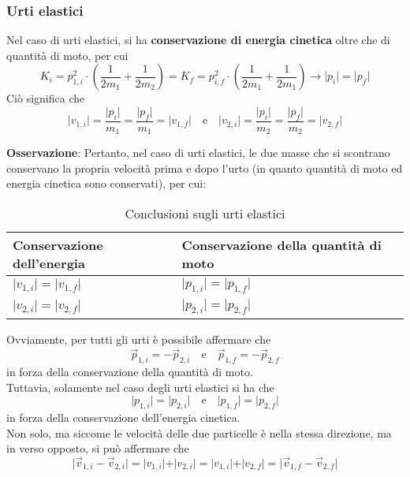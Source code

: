 \documentclass[a4paper]{extarticle}
\begin{document}
\vspace{1em}
\subsubsection{Urti elastici}
Nel caso di urti elastici, si ha \textbf{conservazione di energia cinetica} oltre che di quantità di moto, per cui
\[K_i = p_{1,i}^2 \cdot \left(\frac{1}{2m_1} + \frac{1}{2m_2}\right) = K_f = p_{i,f}^2 \cdot \left(\frac{1}{2m_1} + \frac{1}{2m_1}\right) \longrightarrow \vert p_i \vert = \vert p_f \vert\]
Ciò significa che
\[\boxed{\vert v_{1,i} \vert = \frac{\vert p_i \vert}{m_1} = \frac{\vert p_f \vert}{m_1} = \vert v_{1,f} \vert} \hspace{1em} \text{e} \hspace{1em} \boxed{\vert v_{2,i} \vert = \frac{\vert p_i \vert}{m_2} = \frac{\vert p_f \vert}{m_2} = \vert v_{2,f} \vert}\]

\vspace{1em}
\noindent
\textbf{Osservazione}: Pertanto, nel caso di urti elastici, le due masse che si scontrano conservano la propria velocità prima e dopo l'urto (in quanto quantità di moto ed energia cinetica sono conservati), per cui:

\begin{table}[H]
  \begin{tabularx}{\textwidth}{|P|P|}
    \hline
    \textbf{Conservazione dell'energia} & \textbf{Conservazione della quantità di moto}\\
    \hline
    $\vert v_{1,i} \vert = \vert v_{1,f} \vert$ & $\vert p_{1,i} \vert = \vert p_{1,f} \vert$\\
    \hline
    $\vert v_{2,i} \vert = \vert v_{2,f} \vert$ & $\vert p_{2,i} \vert = \vert p_{2,f} \vert$\\
    \hline
  \end{tabularx}
  \caption{Conclusioni sugli urti elastici}
  \label{tab:conclusioni_urti_elastici}
\end{table}

\noindent
Ovviamente, per tutti gli urti è possibile affermare che
\[\vec p_{1,i} = - \vec p_{2,i} \hspace{1em} \text{e} \hspace{1em} \vec p_{1,f} = - \vec p_{2,f}\]
in forza della conservazione della quantità di moto.\\
Tuttavia, solamente nel caso degli urti elastici si ha che
\[\vert p_{1,i} \vert = \vert p_{2,i} \vert \hspace{1em} \text{e} \hspace{1em} \vert p_{1,f} \vert = \vert p_{2,f} \vert\]
in forza della conservazione dell'energia cinetica.\\
Non solo, ma siccome le velocità delle due particelle è nella stessa direzione, ma in verso opposto, si può affermare che
\[\vert \vec v_{1,i} - \vec v_{2,i} \vert = \vert v_{1,i} \vert + \vert v_{2,i} \vert = \vert v_{1,i} \vert + \vert v_{2,f} \vert = \vert \vec v_{1,f} - \vec v_{2,f} \vert\]
\end{document}
